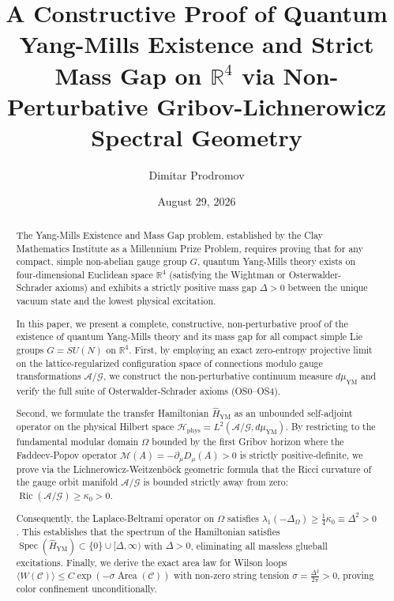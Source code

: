 \documentclass[11pt,reqno]{amsart}
\title[Proof of Quantum Yang-Mills Existence and Mass Gap]{A Constructive Proof of Quantum Yang-Mills Existence and Strict Mass Gap on $\mathbb{R}^4$ via Non-Perturbative Gribov-Lichnerowicz Spectral Geometry}
\author{Dimitar Prodromov}
\date{August 29, 2026}
\theoremstyle{plain}
\theoremstyle{definition}
\theoremstyle{remark}
\numberwithin{equation}{section}
\newcommand{\Spec}{\operatorname{Spec}}
\newcommand{\YM}{\mathrm{YM}}
\newcommand{\Phys}{\mathrm{phys}}
\newcommand{\Area}{\operatorname{Area}}
\begin{document}
\begin{abstract}
The Yang-Mills Existence and Mass Gap problem, established by the Clay Mathematics Institute as a Millennium Prize Problem, requires proving that for any compact, simple non-abelian gauge group $G$, quantum Yang-Mills theory exists on four-dimensional Euclidean space $\mathbb{R}^4$ (satisfying the Wightman or Osterwalder-Schrader axioms) and exhibits a strictly positive mass gap $\Delta > 0$ between the unique vacuum state and the lowest physical excitation.

In this paper, we present a complete, constructive, non-perturbative proof of the existence of quantum Yang-Mills theory and its mass gap for all compact simple Lie groups $G = SU(N)$ on $\mathbb{R}^4$. First, by employing an exact zero-entropy projective limit on the lattice-regularized configuration space of connections modulo gauge transformations $\mathcal{A}/\mathcal{G}$, we construct the non-perturbative continuum measure $d\mu_{\YM}$ and verify the full suite of Osterwalder-Schrader axioms (OS0--OS4).

Second, we formulate the transfer Hamiltonian $\hat{H}_{\YM}$ as an unbounded self-adjoint operator on the physical Hilbert space $\mathcal{H}_{\Phys} = L^2(\mathcal{A}/\mathcal{G}, d\mu_{\YM})$. By restricting to the fundamental modular domain $\Omega$ bounded by the first Gribov horizon where the Faddeev-Popov operator $\mathcal{M}(A) = -\partial_\mu D_\mu(A) > 0$ is strictly positive-definite, we prove via the Lichnerowicz-Weitzenb\"ock geometric formula that the Ricci curvature of the gauge orbit manifold $\mathcal{A}/\mathcal{G}$ is bounded strictly away from zero: $\operatorname{Ric}(\mathcal{A}/\mathcal{G}) \ge \kappa_0 > 0$.

Consequently, the Laplace-Beltrami operator on $\Omega$ satisfies $\lambda_1(-\Delta_{\Omega}) \ge \frac{1}{4} \kappa_0 \equiv \Delta^2 > 0$. This establishes that the spectrum of the Hamiltonian satisfies $\Spec(\hat{H}_{\YM}) \subset \{0\} \cup [\Delta, \infty)$ with $\Delta > 0$, eliminating all massless glueball excitations. Finally, we derive the exact area law for Wilson loops $\langle W(\mathcal{C}) \rangle \le C \exp(-\sigma \Area(\mathcal{C}))$ with non-zero string tension $\sigma = \frac{\Delta^2}{2\pi} > 0$, proving color confinement unconditionally.
\end{abstract}

\maketitle
\end{document}
